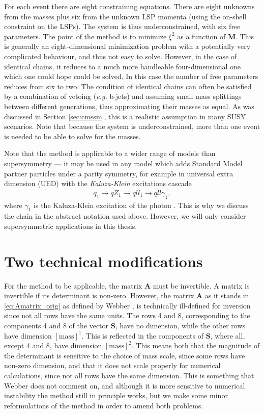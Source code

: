 \documentclass[twoside,english]{uiofysmaster}
\begin{document}
For each event there are eight constraining equations. There are eight unknowns from the masses plus six from the unknown LSP momenta (using the on-shell constraint on the LSPs). The system is thus underconstrained, with six free parameters. The point of the method is to minimize $\xi^2$ as a function of $\mathbf{M}$. This is generally an eight-dimensional minimization problem with a potentially very complicated behaviour, and thus not easy to solve. However, in the case of identical chains, it reduces to a much more handleable four-dimensional one which one could hope could be solved. In this case the number of free parameters reduces from six to two. The condition of identical chains can often be satisfied by a combination of vetoing ({\it e.g.} b-jets) and assuming small mass splittings between different generations, thus approximating their masses as equal. As was discussed in Section \ref{sec:cmssm}, this is a realistic assumption in many SUSY scenarios. Note that because the system is underconstrained, more than one event is needed to be able to solve for the masses.

Note that the method is applicable to a wider range of models than supersymmetry --- it may be used in any model which adds Standard Model partner particles under a parity symmetry, for example in universal extra dimension (UED) with the {\it Kaluza-Klein} excitations cascade
\begin{align}
  q_1 \to qZ_1 \to qll_1 \to qll\gamma_1,
\end{align}
where $\gamma_1$ is the Kaluza-Klein excitation of the photon \cite{Cheng:2002ab}. This is why we discuss the chain in the abstract notation used above. However, we will only consider supersymmetric applications in this thesis.

\section{Two technical modifications}\label{sec:dimension_fixing}
For the method to be applicable, the matrix $\mathbf{A}$ must be invertible. A matrix is invertible if its determinant is non-zero. However, the matrix $\mathbf A$ as it stands in \eqref{eq:Amatrix_orig} as defined by Webber \cite{Webber:2009vm}, is technically ill-defined for inversion since not all rows have the same units. The rows 4 and 8, corresponding to the components 4 and 8 of the vector $\mathbf{S}$, have no dimension, while the other rows have dimension $[\mathrm{mass}]^1$. This is reflected in the components of $\mathbf{S}$, where all, except 4 and 8, have dimension $[\mathrm{mass}]^2$. This means both that the magnitude of the determinant is sensitive to the choice of mass scale, since some rows have non-zero dimension, and that it does not scale properly for numerical calculations, since not all rows have the same dimension. This is something that Webber does not comment on, and although it is more sensitive to numerical instability the method still in principle works, but we make some minor reformulations of the method in order to amend both problems.
\end{document}
